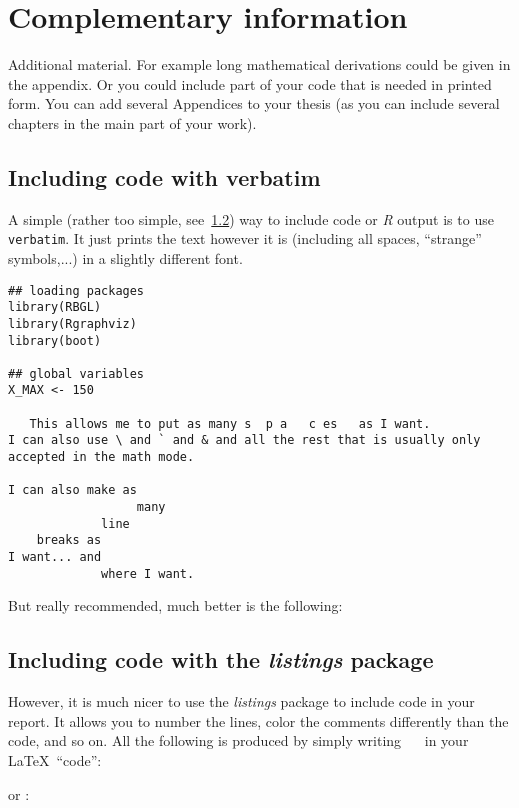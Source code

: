 \chapter{Complementary information}
\label{app:complement}

Additional material. For example long mathematical derivations could be
given in the appendix. Or you could include part of your code that is
needed in printed form. You can add several Appendices to your thesis (as
you can include several chapters in the main part of your work).

\section{Including \Rp code with verbatim}
A simple (rather too simple, see~\ref{App:listings}) way to include code or
{\it R} output is to use 
\texttt{verbatim}. It just prints the text however it is (including all
spaces, ``strange'' symbols,...) in a slightly different font.
\begin{verbatim}
## loading packages
library(RBGL)
library(Rgraphviz)
library(boot)

## global variables
X_MAX <- 150

   This allows me to put as many s  p a   c es   as I want.
I can also use \ and ` and & and all the rest that is usually only 
accepted in the math mode.

I can also make as 
                  many 
             line 
    breaks as 
I want... and
             where I want. 
\end{verbatim}

But really recommended,  much better is the following:

\section{Including \Rp code with the \emph{listings} package}\label{App:listings}
However, it is much nicer to use the \emph{listings} package to include \Rp
code in your report. It allows you to number the lines, color the comments
differently than the code, and so on.
All the following is produced by simply writing
\verb!  !  in your \LaTeX\ ``code'':



or \verb!! :


